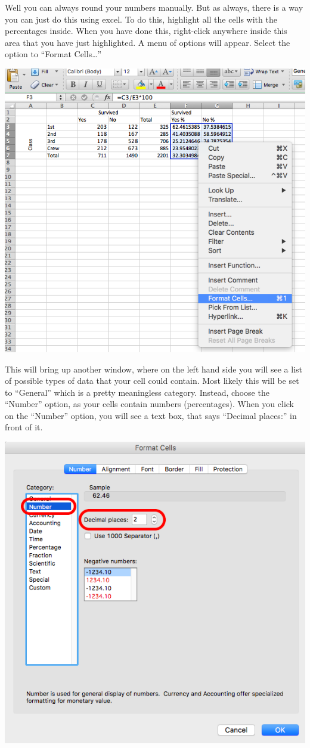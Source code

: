 \documentclass[
]{book}
\begin{document}
Well you can always round your numbers manually. But as always, there is a way you can just do this using excel. To do this, highlight all the cells with the percentages inside. When you have done this, right-click anywhere inside this area that you have just highlighted. A menu of options will appear. Select the option to ``Format Cells\ldots{}''

\includegraphics{imgs/format_cells.png}

This will bring up another window, where on the left hand side you will see a list of possible types of data that your cell could contain. Most likely this will be set to ``General'' which is a pretty meaningless category. Instead, choose the ``Number'' option, as your cells contain numbers (percentages). When you click on the ``Number'' option, you will see a text box, that says ``Decimal places:'' in front of it.

\includegraphics{imgs/num_dec_set.png}
\end{document}
